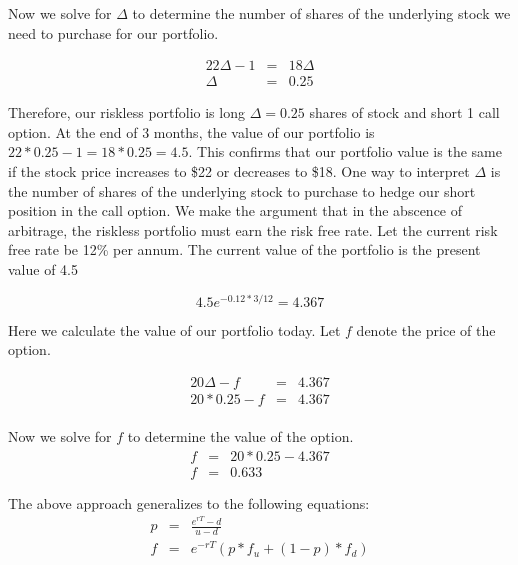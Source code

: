 \documentclass{article}\usepackage[]{graphicx}\usepackage[]{color}
\begin{document}
Now we solve for $\Delta$ to determine the number of shares of the underlying stock we need to purchase for our portfolio.

\begin{eqnarray*}
22 \Delta - 1 &=& 18 \Delta\\
\Delta &=& 0.25
\end{eqnarray*}

Therefore, our riskless portfolio is long $\Delta = 0.25$ shares of stock and short 1 call option. At the end of 3 months, the value of our portfolio is $22 * 0.25 - 1 = 18 * 0.25 = 4.5$. This confirms that our portfolio value is the same if the stock price increases to \$22 or decreases to \$18. One way to interpret $\Delta$ is the number of shares of the underlying stock to purchase to hedge our short position in the call option. We make the argument that in the abscence of arbitrage, the riskless portfolio must earn the risk free rate. Let the current risk free rate be 12\% per annum. The current value of the portfolio is the present value of 4.5

\begin{equation*}
4.5 e^{-0.12 * 3 / 12} = 4.367
\end{equation*}

Here we calculate the value of our portfolio today. Let $f$ denote the price of the option.

\begin{eqnarray*}
20 \Delta - f &=& 4.367\\
20 * 0.25 - f &=& 4.367\\
\end{eqnarray*}

Now we solve for $f$ to determine the value of the option.
\begin{eqnarray*}
f &=& 20 * 0.25 - 4.367\\
f &=& 0.633
\end{eqnarray*}


The above approach generalizes to the following equations:
\begin{eqnarray*}
p &=& \frac{e^{rT} - d}{u - d}\\
f &=& e^{-r T} (p * f_u + (1 - p) * f_d)\\
\end{eqnarray*}
\end{document}
